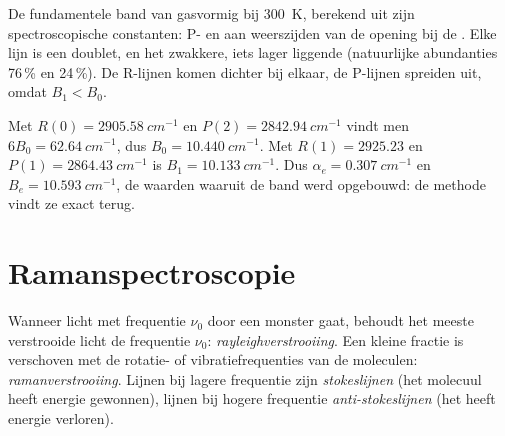 \begin{omfigure}

{\small De fundamentele band van gasvormig  bij \qty{300}{K},
berekend uit zijn spectroscopische constanten: P- en  aan weerszijden
van de opening bij de . Elke lijn is een doublet,
 en het zwakkere, iets lager liggende 
(natuurlijke abundanties 76\,\% en 24\,\%). De R-lijnen komen dichter bij
elkaar, de P-lijnen spreiden uit, omdat $B_1 < B_0$.}
\end{omfigure}

\begin{example}\label{ex:b3:rovibrational-spectroscopy:analysis}
Met $R(0) = \qty{2905.58}{cm^{-1}}$ en $P(2) = \qty{2842.94}{cm^{-1}}$ vindt men
$6B_0 = \qty{62.64}{cm^{-1}}$, dus $B_0 = \qty{10.440}{cm^{-1}}$. Met $R(1) = 2925.23$ en $P(1) =
\qty{2864.43}{cm^{-1}}$ is $B_1 = \qty{10.133}{cm^{-1}}$. Dus $\alpha_e = \qty{0.307}{cm^{-1}}$
en $B_e = \qty{10.593}{cm^{-1}}$, de waarden waaruit de band werd opgebouwd:
de methode vindt ze exact terug.
\end{example}

\section{Ramanspectroscopie}

\begin{definition}\label{def:b3:rovibrational-spectroscopy:raman}
Wanneer licht met frequentie $\nu_0$ door een monster gaat, behoudt het
meeste verstrooide licht de frequentie $\nu_0$:
\emph{rayleighverstrooiing}.
Een kleine fractie is verschoven met de rotatie- of vibratiefrequenties
van de moleculen: \emph{ramanverstrooiing}.
Lijnen bij lagere frequentie zijn \emph{stokeslijnen} (het
molecuul heeft energie gewonnen), lijnen bij hogere frequentie
\emph{anti-stokeslijnen} (het heeft energie verloren).
\end{definition}

